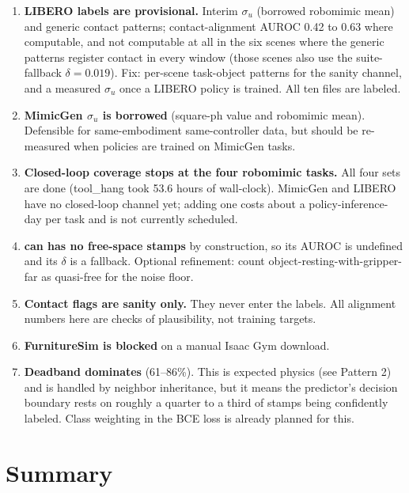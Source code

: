 \documentclass[11pt]{article}
\begin{document}
\begin{enumerate}[leftmargin=2em]
  \item \textbf{LIBERO labels are provisional.} Interim $\sigma_u$ (borrowed
        robomimic mean) and generic contact patterns; contact-alignment AUROC 0.42
        to 0.63 where computable, and not computable at all in the six scenes where
        the generic patterns register contact in every window (those scenes also
        use the suite-fallback $\delta = 0.019$). Fix: per-scene task-object
        patterns for the sanity channel, and a measured $\sigma_u$ once a LIBERO
        policy is trained. All ten files are labeled.
  \item \textbf{MimicGen $\sigma_u$ is borrowed} (square-ph value and robomimic
        mean). Defensible for same-embodiment same-controller data, but should be
        re-measured when policies are trained on MimicGen tasks.
  \item \textbf{Closed-loop coverage stops at the four robomimic tasks.} All
        four sets are done (tool\_hang took 53.6 hours of wall-clock). MimicGen
        and LIBERO have no closed-loop channel yet; adding one costs about a
        policy-inference-day per task and is not currently scheduled.
  \item \textbf{can has no free-space stamps} by construction, so its AUROC is
        undefined and its $\delta$ is a fallback. Optional refinement: count
        object-resting-with-gripper-far as quasi-free for the noise floor.
  \item \textbf{Contact flags are sanity only.} They never enter the labels. All
        alignment numbers here are checks of plausibility, not training targets.
  \item \textbf{FurnitureSim is blocked} on a manual Isaac Gym download.
  \item \textbf{Deadband dominates} (61--86\%). This is expected physics (see
        Pattern 2) and is handled by neighbor inheritance, but it means the
        predictor's decision boundary rests on roughly a quarter to a third of
        stamps being confidently labeled. Class weighting in the BCE loss is
        already planned for this.
\end{enumerate}

\section{Summary}
\end{document}
